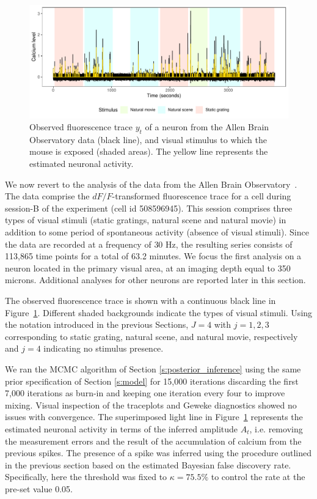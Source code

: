 \begin{figure}
	\centerline{\includegraphics[width = \linewidth]{_Images/ch3_plot_data_new.pdf}}
	\caption[Observed fluorescence trace of a neuron from the Allen Brain Observatory data and estimated neuronal activity.]{Observed fluorescence trace $y_t$ of a neuron from the Allen Brain Observatory data (black line), and visual stimulus to which the mouse is exposed (shaded areas). The yellow line represents the estimated neuronal activity.}
	\label{fig:y}
\end{figure}

We now revert to the analysis of the data from the Allen Brain Observatory~\parencite{allen}. The data comprise the $dF/F$-transformed fluorescence trace for a cell during session-B of the experiment (cell id 508596945). This session comprises three types of visual stimuli (static gratings, natural scene and natural movie) in addition to some period of spontaneous activity (absence of visual stimuli). Since the data are recorded at a frequency of $30$ Hz, the resulting series consists of 113{,}865 time points for a total of 63.2 minutes. 
We focus the first analysis on a neuron located in the primary visual area, at an imaging depth equal to 350 microns. Additional analyses for other neurons are reported later in this section.


The observed fluorescence trace is shown with a continuous black line in Figure~\ref{fig:y}. Different shaded backgrounds indicate the types of visual stimuli.
Using the notation introduced in the previous Sections, $J=4$ with $j=1, 2, 3$ corresponding to static grating, natural scene, and natural movie, respectively and $j=4$ indicating no stimulus presence. 


We ran the MCMC algorithm of Section \ref{s:posterior_inference} using the same prior specification of Section \ref{s:model} for 15{,}000 iterations discarding the first 7{,}000 iterations as burn-in and keeping one iteration every four to improve mixing.  Visual inspection of the traceplots and Geweke diagnostics showed no issues with convergence. 
%
The superimposed light line in Figure~\ref{fig:y} represents the estimated neuronal activity in terms of the inferred amplitude $A_t$, i.e. removing the measurement errors and the result of the accumulation of calcium from the previous spikes. 
The presence of a spike was inferred using the procedure outlined in the previous section based on the estimated Bayesian false discovery rate. Specifically, here the threshold was fixed to $\kappa=75.5\%$ to control the rate at the pre-set value 0.05.



